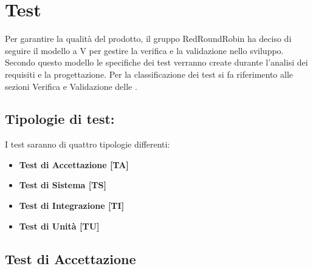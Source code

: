 \section{Test}
	Per garantire la qualità del prodotto, il gruppo RedRoundRobin ha deciso di seguire il modello a V per gestire la verifica e la validazione nello sviluppo. Secondo questo modello le specifiche dei test verranno create durante l'analisi dei requisiti e la progettazione.
	Per la classificazione dei test si fa riferimento alle sezioni Verifica e Validazione delle .
	

	\subsection{Tipologie di test:}
		I test saranno di quattro tipologie differenti:
		\begin{itemize}

			\item \textbf{Test di Accettazione [TA]}
			\item \textbf{Test di Sistema [TS]}
			\item \textbf{Test di Integrazione [TI]}
			\item \textbf{Test di Unità [TU]}

		\end{itemize}

	\subsection{Test di Accettazione}
		
